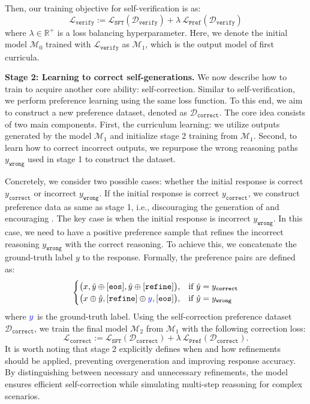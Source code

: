Then, our training objective for self-verification is as:
\begin{equation}
    \mathcal{L}_{\mathtt{verify}} := \mathcal{L}_{\mathtt{SFT}}(\mathcal{D}_{\mathtt{verify}}) + \lambda ~ \mathcal{L}_{\mathtt{Pref}}(\mathcal{D}_{\mathtt{verify}}) 
\end{equation}
where $\lambda\in\mathbb{R}^{+}$ is a loss balancing hyperparameter. Here, we denote the initial model $\mathcal{M}_0$ trained with $\mathcal{L}_{\mathtt{verify}}$ as $\mathcal{M}_1$, which is the output model of first curricula. 

\textbf{Stage 2: Learning to correct self-generations.} We now describe how to train \sname to acquire another core ability: self-correction. Similar to self-verification, we perform preference learning using the same loss function. To this end, we aim to construct a new preference dataset, denoted as $\mathcal{D}_{\mathtt{correct}}$. The core idea consists of two main components. First, the curriculum learning: we utilize outputs generated by the model $\mathcal{M}_1$ and initialize stage 2 training from $\mathcal{M}_1$. Second, to learn how to correct incorrect outputs, we repurpose the wrong reasoning paths $y_{\mathtt{wrong}}$ used in stage 1 to construct the dataset.

Concretely, we consider two possible cases: whether the initial response is correct $y_{\mathtt{correct}}$ or incorrect $y_{\mathtt{wrong}}$. If the initial response is correct $y_{\mathtt{correct}}$, we construct preference data as same as stage 1, i.e., discouraging the generation of \rethink and encouraging \eos. The key case is when the initial response is incorrect $y_{\mathtt{wrong}}$. In this case, we need to have a positive preference sample that refines the incorrect reasoning $y_{\mathtt{wrong}}$ with the correct reasoning. To achieve this, we concatenate the ground-truth label $y$ to the response. Formally, the preference pairs are defined as:
\[
\begin{cases}
\big(x, \hat{y}\oplus[\mathtt{eos}], \hat{y}\oplus[\mathtt{refine}]\big), & \text{if } \hat{y}=y_{\mathtt{correct}}\\
\big(x \oplus \hat{y}, [\mathtt{refine}]\oplus\textcolor{blue}{y},  [\mathtt{eos}]\big), & \text{if }  \hat{y}=y_{\mathtt{wrong}}\\
\end{cases} 
\]
where $\textcolor{blue}{y}$ is the ground-truth label. Using the self-correction preference dataset $\mathcal{D}_{\mathtt{correct}}$, we train the final model $\mathcal{M}_{2}$ from $\mathcal{M}_{1}$ with the following correction loss:
\begin{equation}
    \mathcal{L}_{\mathtt{correct}} := \mathcal{L}_{\mathtt{SFT}}(\mathcal{D}_{\mathtt{correct}}) + \lambda ~ \mathcal{L}_{\mathtt{Pref}}(\mathcal{D}_{\mathtt{correct}}).
\end{equation}
It is worth noting that stage 2 explicitly defines when and how refinements should be applied, preventing overgeneration and improving response accuracy. By distinguishing between necessary and unnecessary refinements, the model ensures efficient self-correction while simulating multi-step reasoning for complex scenarios.

